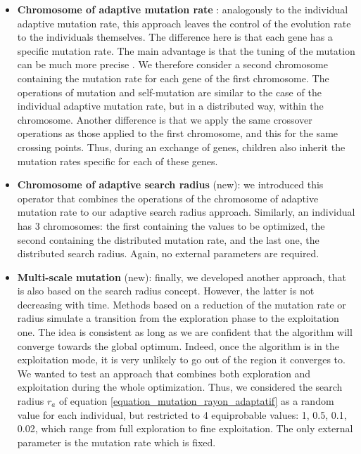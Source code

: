 \documentclass[twocol]{ametsoc}
\begin{document}
\begin{itemize}
	\item \textbf{Chromosome of adaptive mutation rate} \citep[\textit{n adaptative mutation rate},][]{Back1992a}: analogously to the individual adaptive mutation rate, this approach leaves the control of the evolution rate to the individuals themselves. The difference here is that each gene has a specific mutation rate. The main advantage is that the tuning of the mutation can be much more precise \citep{Smith1997a}. We therefore consider a second chromosome containing the mutation rate for each gene of the first chromosome. The operations of mutation and self-mutation are similar to the case of the individual adaptive mutation rate, but in a distributed way, within the chromosome. Another difference is that we apply the same crossover operations as those applied to the first chromosome, and this for the same crossing points. Thus, during an exchange of genes, children also inherit the mutation rates specific for each of these genes.
	
	\item \textbf{Chromosome of adaptive search radius} (new): we introduced this operator that combines the operations of the chromosome of adaptive mutation rate to our adaptive search radius approach. Similarly, an individual has 3 chromosomes: the first containing the values to be optimized, the second containing the distributed mutation rate, and the last one, the distributed search radius. Again, no external parameters are required.
	
	\item \textbf{Multi-scale mutation} (new): finally, we developed another approach, that is also based on the search radius concept. However, the latter is not decreasing with time. Methods based on a reduction of the mutation rate or radius simulate a transition from the exploration phase to the exploitation one. The idea is consistent as long as we are confident that the algorithm will converge towards the global optimum. Indeed, once the algorithm is in the exploitation mode, it is very unlikely to go out of the region it converges to. We wanted to test an approach that combines both exploration and exploitation during the whole optimization. Thus, we considered the search radius $r_{a}$ of equation \ref{equation_mutation_rayon_adaptatif} as a random value for each individual, but restricted to 4 equiprobable values: 1, 0.5, 0.1, 0.02, which range from full exploration to fine exploitation. The only external parameter is the mutation rate which is fixed.
	
	
\end{itemize}
\end{document}
